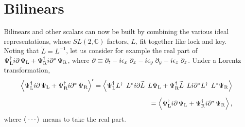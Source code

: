 \documentclass[letterpaper,12pt,titlepage,oneside,final]{book}
\begin{document}




\section{Bilinears   }

Bilinears and other scalars can now be built by combining the various ideal representations, whose $SL(2, \mathbb{C})$ factors, $L$, fit together like lock and key.  Noting that $\widetilde{L} = L^{-1}$, let us consider for example the real part of $\Psi_{\textup{L}}^{\dagger} i \partial \hspace{0.05cm} \Psi_{\textup{L}} +  \Psi_{\textup{R}}^{\dagger} i {\partial}^* \hspace{0.05cm} \Psi_{\textup{R}} $, where  $\partial \equiv \partial_t -i{\epsilon_x}\hspace{1mm} \partial_x- i{\epsilon_y}\hspace{1mm} \partial_y- i{\epsilon_z} \hspace{1mm}\partial_z$.  Under a Lorentz transformation, 
\begin{equation}\begin{array}{r}\left<\Psi_{\textup{L}}^{\dagger} i \partial \hspace{0.05cm} \Psi_{\textup{L}} +  \Psi_{\textup{R}}^{\dagger} i {\partial}^* \hspace{0.05cm} \Psi_{\textup{R}} \right>'
= \left<\Psi_{\textup{L}}^{\dagger} L^{\dagger} \hspace{0.15cm} L^* i \partial \widetilde{L} \hspace{0.15cm} {L}  \Psi_{\textup{L}} + \Psi_{\textup{R}}^{\dagger} \widetilde{L} \hspace{0.15cm} L i {\partial}^* L^{\dagger} \hspace{0.15cm} {L}^*  \Psi_{\textup{R}}\right>  \vspace{3mm}\\
=\left< \Psi_{\textup{L}}^{\dagger} i \partial \hspace{0.05cm} \Psi_{\textup{L}} +  \Psi_{\textup{R}}^{\dagger} i {\partial}^* \hspace{0.05cm} \Psi_{\textup{R}}\right>,
\end{array}\end{equation}
\noindent where $\left<\hspace{1mm}\cdots\right>$ means to take the real part.  
\end{document}
